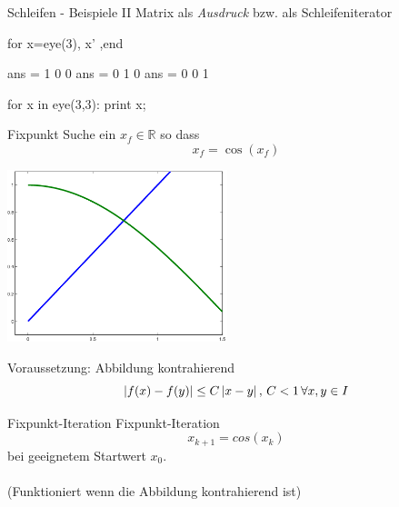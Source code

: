 \documentclass[hyperref={xetex}]{beamer}
\begin{document}
\begin{frame}[fragile]{Schleifen - Beispiele II}
Matrix als {\it Ausdruck} bzw. als Schleifeniterator
\begin{matlabin}
for x=eye(3),  x' ,end
\end{matlabin}
\begin{matlab}
ans =     1     0     0
ans =     0     1     0
ans =     0     0     1 
\end{matlab}
\begin{pyin}
for x in eye(3,3): print x;
\end{pyin}
\begin{pyout}
  [ 1.  0.  0.]
  [ 0.  1.  0.]
  [ 0.  0.  1.]
\end{pyout}
\end{frame}


%
%
\begin{frame}[fragile]{Fixpunkt}
Suche ein $x_f \in \mathbb{R}$ so dass
\[ x_f = \cos (x_f ) \]
\begin{center}
\includegraphics[height=5cm]{figures/fixpunkt}
\end{center}
Voraussetzung: Abbildung kontrahierend 
\[
\left\lvert f(x)-f(y)\right\rvert \leq C \left\lvert x-y\right\rvert,\, C < 1\,  \forall  x,y \in  I
\]

\end{frame}
%
%
\begin{frame}[fragile]{Fixpunkt-Iteration}
Fixpunkt-Iteration 
\[ x_{k+1}=cos(x_k) \]
bei geeignetem Startwert $x_0$.  \\
\\
(Funktioniert wenn die Abbildung kontrahierend ist)
\end{frame}
\end{document}

